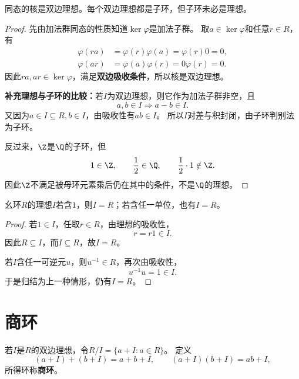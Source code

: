 \begin{proposition}
同态的核是双边理想。每个双边理想都是子环，但子环未必是理想。
\end{proposition}
\begin{proof}
先由加法群同态的性质知道$\ker\varphi$是加法子群。
取$a\in\ker\varphi$和任意$r\in R$，有
\[
\begin{aligned}
\varphi(ra)&=\varphi(r)\varphi(a)=\varphi(r)0=0,\\
\varphi(ar)&=\varphi(a)\varphi(r)=0\varphi(r)=0.
\end{aligned}
\]
因此$ra,ar\in\ker\varphi$，满足\textbf{双边吸收条件}，所以核是双边理想。

\textbf{补充理想与子环的比较：}若$I$为双边理想，则它作为加法子群非空，且
\[
a,b\in I\Longrightarrow a-b\in I.
\]
又因为$a\in I\subseteq R,b\in I$，由吸收性有$ab\in I$。
所以$I$对差与积封闭，由子环判别法为子环。

反过来，$\Z$是$\Q$的子环，但
\[
1\in\Z,\qquad \frac12\in\Q,\qquad \frac12\cdot1\notin\Z.
\]
因此$\Z$不满足被母环元素乘后仍在其中的条件，不是$\Q$的理想。
\end{proof}

\begin{proposition}
幺环$R$的理想$I$若含$1$，则$I=R$；若含任一单位，也有$I=R$。
\end{proposition}
\begin{proof}
若$1\in I$，任取$r\in R$，由理想的吸收性，
\[
r=r1\in I.
\]
因此$R\subseteq I$，而$I\subseteq R$，故$I=R$。

若$I$含任一可逆元$u$，则$u^{-1}\in R$，再次由吸收性，
\[
u^{-1}u=1\in I.
\]
于是归结为上一种情形，仍有$I=R$。
\end{proof}
\section{商环}
\begin{definition}
\label{p2:concept:c1-l1252}若$I$是$R$的双边理想，令$R/I=\{a+I:a\in R\}$。
定义
\[
(a+I)+(b+I)=a+b+I,\qquad(a+I)(b+I)=ab+I,
\]
所得环称\textbf{商环}。
\end{definition}

